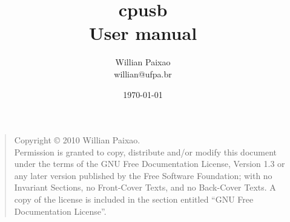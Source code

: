 \documentclass[a4paper,12pt]{article}
\title{cpusb\\User manual}
\author{Willian Paixao\\willian@ufpa.br}
\date{\today}
\begin{document}
        \maketitle

        \begin{quote}
            Copyright \copyright{}  2010  Willian Paixao.\\
            Permission is granted to copy, distribute and/or modify this document
            under the terms of the GNU Free Documentation License, Version 1.3
            or any later version published by the Free Software Foundation;
            with no Invariant Sections, no Front-Cover Texts, and no Back-Cover Texts.
            A copy of the license is included in the section entitled ``GNU
            Free Documentation License''.
        \end{quote}
        \newpage

        \tableofcontents \newpage
\end{document}
